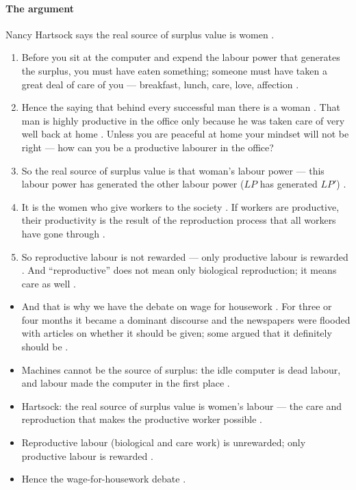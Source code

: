 \paragraph{The argument}
\begin{KeyConcept}
Nancy Hartsock says the real source of surplus value is women .
\end{KeyConcept}

\begin{enumerate}
    \item Before you sit at the computer and expend the labour power that generates the surplus, you must have eaten something; someone must have taken a great deal of care of you --- breakfast, lunch, care, love, affection .
    \item Hence the saying that behind every successful man there is a woman . That man is highly productive in the office only because he was taken care of very well back at home . Unless you are peaceful at home your mindset will not be right --- how can you be a productive labourer in the office? 
    \item So the real source of surplus value is that woman's labour power --- this labour power has generated the other labour power ($LP$ has generated $LP'$) .
    \item It is the women who give workers to the society . If workers are productive, their productivity is the result of the reproduction process that all workers have gone through .
    \item So reproductive labour is not rewarded --- only productive labour is rewarded . And ``reproductive'' does not mean only biological reproduction; it means care as well .
\end{enumerate}

\begin{itemize}
    \item And that is why we have the debate on wage for housework . For three or four months it became a dominant discourse and the newspapers were flooded with articles on whether it should be given; some argued that it definitely should be .
\end{itemize}

\begin{QuickRevision}
\begin{itemize}
    \item Machines cannot be the source of surplus: the idle computer is dead labour, and labour made the computer in the first place .
    \item Hartsock: the real source of surplus value is women's labour --- the care and reproduction that makes the productive worker possible .
    \item Reproductive labour (biological and care work) is unrewarded; only productive labour is rewarded .
    \item Hence the wage-for-housework debate .
\end{itemize}
\end{QuickRevision}

